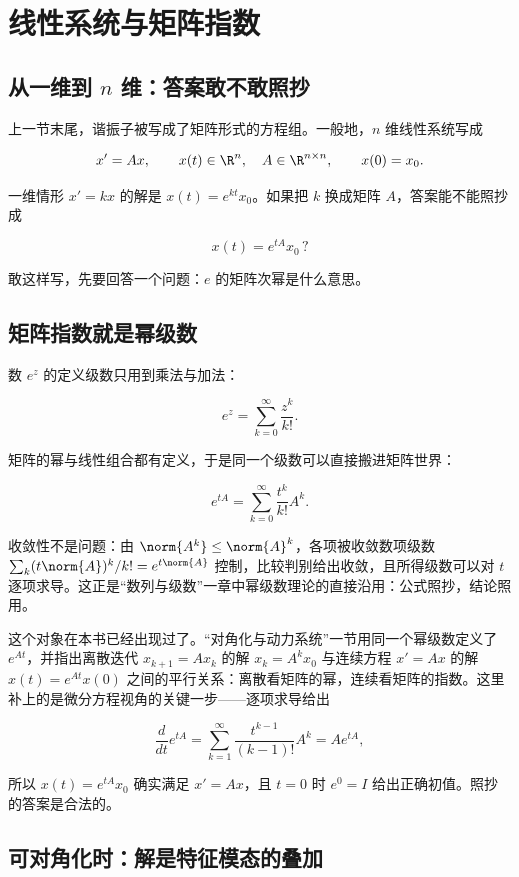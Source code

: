 \section{线性系统与矩阵指数}

\subsection{从一维到 \(n\) 维：答案敢不敢照抄}

上一节末尾，谐振子被写成了矩阵形式的方程组。一般地，\(n\) 维线性系统写成

\[
x'=Ax,
\qquad
x(t)\in\R^n,\quad A\in\R^{n\times n},
\qquad
x(0)=x_0.
\]

一维情形 \(x'=kx\) 的解是 \(x(t)=e^{kt}x_0\)。如果把 \(k\) 换成矩阵 \(A\)，答案能不能照抄成

\[
x(t)=e^{tA}x_0\,?
\]

敢这样写，先要回答一个问题：\(e\) 的矩阵次幂是什么意思。

\subsection{矩阵指数就是幂级数}

数 \(e^z\) 的定义级数只用到乘法与加法：

\[
e^{z}=\sum_{k=0}^{\infty}\frac{z^k}{k!}.
\]

矩阵的幂与线性组合都有定义，于是同一个级数可以直接搬进矩阵世界：

\[
e^{tA}=\sum_{k=0}^{\infty}\frac{t^k}{k!}A^k.
\]

收敛性不是问题：由 \(\norm{A^k}\le\norm{A}^k\)，各项被收敛数项级数 \(\sum_k(t\norm{A})^k/k!=e^{t\norm{A}}\) 控制，比较判别给出收敛，且所得级数可以对 \(t\) 逐项求导。这正是``数列与级数''一章中幂级数理论的直接沿用：公式照抄，结论照用。

这个对象在本书已经出现过了。``对角化与动力系统''一节用同一个幂级数定义了 \(e^{At}\)，并指出离散迭代 \(x_{k+1}=Ax_k\) 的解 \(x_k=A^kx_0\) 与连续方程 \(x'=Ax\) 的解 \(x(t)=e^{At}x(0)\) 之间的平行关系：离散看矩阵的幂，连续看矩阵的指数。这里补上的是微分方程视角的关键一步——逐项求导给出

\[
\frac{d}{dt}e^{tA}
=\sum_{k=1}^{\infty}\frac{t^{k-1}}{(k-1)!}A^k
=Ae^{tA},
\]

所以 \(x(t)=e^{tA}x_0\) 确实满足 \(x'=Ax\)，且 \(t=0\) 时 \(e^{0}=I\) 给出正确初值。照抄的答案是合法的。

\subsection{可对角化时：解是特征模态的叠加}

